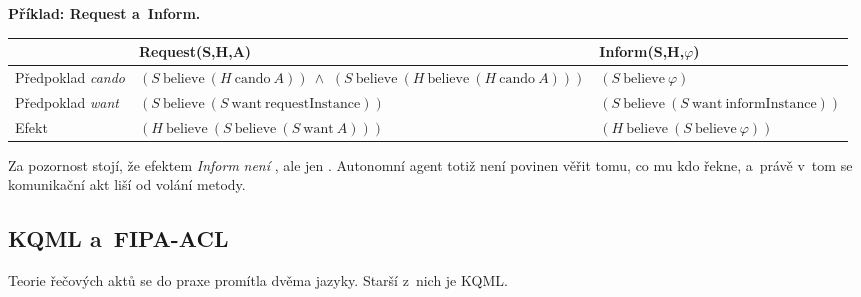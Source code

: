 \documentclass[11pt,a4paper]{article}
\theoremstyle{definition}
\begin{document}
\noindent\textbf{Příklad: Request a~Inform.}
\begin{center}\small
\begin{tabular}{p{} p{} p{}}
\toprule
& \textbf{Request(S,H,A)} & \textbf{Inform(S,H,$\varphi$)} \\
\midrule
Předpoklad \emph{cando}
  & $(S\ \mathrm{believe}\ (H\ \mathrm{cando}\ A))\ \wedge$ \newline
    $(S\ \mathrm{believe}\ (H\ \mathrm{believe}\ (H\ \mathrm{cando}\ A)))$
  & $(S\ \mathrm{believe}\ \varphi)$ \\
Předpoklad \emph{want}
  & $(S\ \mathrm{believe}\ (S\ \mathrm{want}\ \mathrm{requestInstance}))$
  & $(S\ \mathrm{believe}\ (S\ \mathrm{want}\ \mathrm{informInstance}))$ \\
Efekt
  & $(H\ \mathrm{believe}\ (S\ \mathrm{believe}\ (S\ \mathrm{want}\ A)))$
  & $(H\ \mathrm{believe}\ (S\ \mathrm{believe}\ \varphi))$ \\
\bottomrule
\end{tabular}
\end{center}
Za pozornost stojí, že efektem \emph{Inform} \emph{není} , ale jen
. Autonomní agent totiž není povinen věřit tomu,
co mu kdo řekne, a~právě v~tom se komunikační akt liší od volání metody.

\subsection{KQML a~FIPA-ACL}
\label{ssec:kqml-acl}

Teorie řečových aktů se do praxe promítla dvěma jazyky. Starší z~nich je KQML.
\end{document}
